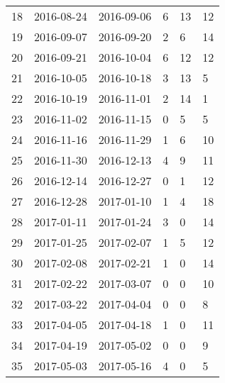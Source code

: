 \begin{table}[]
{\begin{tabular}{@{}llllll@{}}
			18     & 2016-08-24 & 2016-09-06 & 6            & 13                 & 12       \\
			19     & 2016-09-07 & 2016-09-20 & 2            & 6                  & 14       \\
			20     & 2016-09-21 & 2016-10-04 & 6            & 12                 & 12       \\
			21     & 2016-10-05 & 2016-10-18 & 3            & 13                 & 5        \\
			22     & 2016-10-19 & 2016-11-01 & 2            & 14                 & 1        \\
			23     & 2016-11-02 & 2016-11-15 & 0            & 5                  & 5        \\
			24     & 2016-11-16 & 2016-11-29 & 1            & 6                  & 10       \\
			25     & 2016-11-30 & 2016-12-13 & 4            & 9                  & 11       \\
			26     & 2016-12-14 & 2016-12-27 & 0            & 1                  & 12       \\
			27     & 2016-12-28 & 2017-01-10 & 1            & 4                  & 18       \\
			28     & 2017-01-11 & 2017-01-24 & 3            & 0                  & 14       \\
			29     & 2017-01-25 & 2017-02-07 & 1            & 5                  & 12       \\
			30     & 2017-02-08 & 2017-02-21 & 1            & 0                  & 14       \\
			31     & 2017-02-22 & 2017-03-07 & 0            & 0                  & 10       \\
			32     & 2017-03-22 & 2017-04-04 & 0            & 0                  & 8        \\
			33     & 2017-04-05 & 2017-04-18 & 1            & 0                  & 11       \\
			34     & 2017-04-19 & 2017-05-02 & 0            & 0                  & 9        \\
			35     & 2017-05-03 & 2017-05-16 & 4            & 0                  & 5        \\ \bottomrule
		\end{tabular}%
	}
\end{table}


